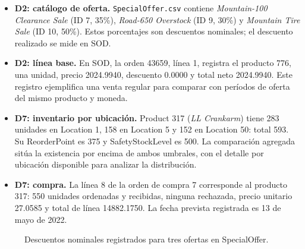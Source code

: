 \documentclass[10pt,a4paper]{article}
\begin{document}
\begin{itemize}
  \item \textbf{D2: catálogo de oferta.} \texttt{SpecialOffer.csv} contiene
  \emph{Mountain-100 Clearance Sale} (ID 7, 35\%), \emph{Road-650 Overstock}
  (ID 9, 30\%) y \emph{Mountain Tire Sale} (ID 10, 50\%). Estos porcentajes
  son descuentos nominales; el descuento realizado se mide en SOD.
  \item \textbf{D2: línea base.} En SOD, la orden 43659, línea 1, registra el
  producto 776, una unidad, precio 2024.9940, descuento 0.0000 y total neto
  2024.9940. Este registro ejemplifica una venta regular para comparar con
  períodos de oferta del mismo producto y moneda.
  \item \textbf{D7: inventario por ubicación.} Product 317 (\emph{LL Crankarm})
  tiene 283 unidades en Location 1, 158 en Location 5 y 152 en Location 50:
  total 593. Su ReorderPoint es 375 y SafetyStockLevel es 500. La comparación
  agregada sitúa la existencia por encima de ambos umbrales, con el detalle
  por ubicación disponible para analizar la distribución.
  \item \textbf{D7: compra.} La línea 8 de la orden de compra 7 corresponde al
  producto 317: 550 unidades ordenadas y recibidas, ninguna rechazada, precio
  unitario 27.0585 y total de línea 14882.1750. La fecha prevista registrada
  es 13 de mayo de 2022.
\end{itemize}

\begin{figure}[htbp]
\centering
{}
\caption{Descuentos nominales registrados para tres ofertas en SpecialOffer.}
\end{figure}
\end{document}
